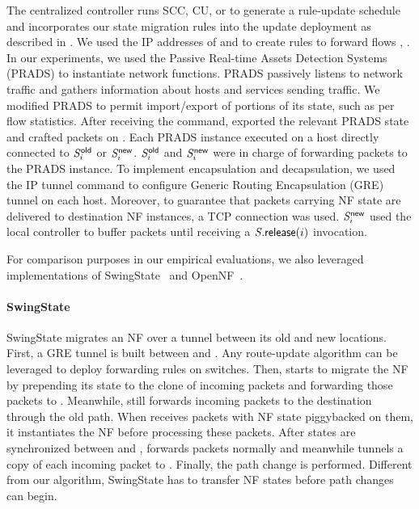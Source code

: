 The centralized controller runs SCC, CU, or \ourRouteUpdateName to
generate a rule-update schedule and incorporates our state migration
rules into the update deployment as described in
.  We used the IP addresses of
\newSwitchID{\nfIdx} and \oldSwitchID{\nfIdx} to create rules to
forward flows \flowIDMigrate{\nfIdx}, \flowIDTunnel{\nfIdx}.  In our
experiments, we used the Passive Real-time Assets Detection Systems
(PRADS) to instantiate network functions. PRADS passively listens to
network traffic and gathers information about hosts and services
sending traffic. We modified PRADS to permit import/export of portions
of its state, such as per flow statistics. After receiving the
\oldSwitchID{\nfIdx}{\export} command, \oldSwitchID{\nfIdx} exported
the relevant PRADS state and crafted packets on \flowIDMigrate{\nfIdx}.
Each PRADS instance executed on a host directly connected to
$\oldSwitchID{\nfIdx}$ or $\newSwitchID{\nfIdx}$.
$\oldSwitchID{\nfIdx}$ and $\newSwitchID{\nfIdx}$ were in charge of
forwarding packets to the PRADS instance.  To implement encapsulation
and decapsulation, we used the IP tunnel command to configure Generic
Routing Encapsulation (GRE) tunnel on each host.  Moreover, to
guarantee that packets carrying NF state are delivered to destination
NF instances, a TCP connection was used. $\newSwitchID{\nfIdx}$ used
the local controller to buffer packets until receiving a
$\switchID{}{\release{\nfIdx}}$ invocation.

For comparison purposes in our empirical evaluations, we also
leveraged implementations of SwingState~\cite{swingstate} and
OpenNF~\cite{opennf}.

\paragraph{SwingState}
SwingState migrates an NF over a tunnel between its old and new
locations.  First, a GRE tunnel is built between \oldSwitchID{\nfIdx}
and \newSwitchID{\nfIdx}. Any route-update algorithm can be leveraged
to deploy forwarding rules on switches. Then, \oldSwitchID{\nfIdx}
starts to migrate the NF by prepending its state to the clone of
incoming packets and forwarding those packets to \newSwitchID{\nfIdx}.
Meanwhile, \oldSwitchID{\nfIdx} still forwards incoming packets to the
destination through the old path. When \newSwitchID{\nfIdx} receives
packets with NF state piggybacked on them, it instantiates the NF
before processing these packets.  After states are synchronized
between \oldSwitchID{\nfIdx} and \newSwitchID{\nfIdx},
\oldSwitchID{\nfIdx} forwards packets normally and meanwhile tunnels a
copy of each incoming packet to \newSwitchID{\nfIdx}.  Finally, the
path change is performed.  Different from our algorithm, SwingState
has to transfer NF states before path changes can begin.

